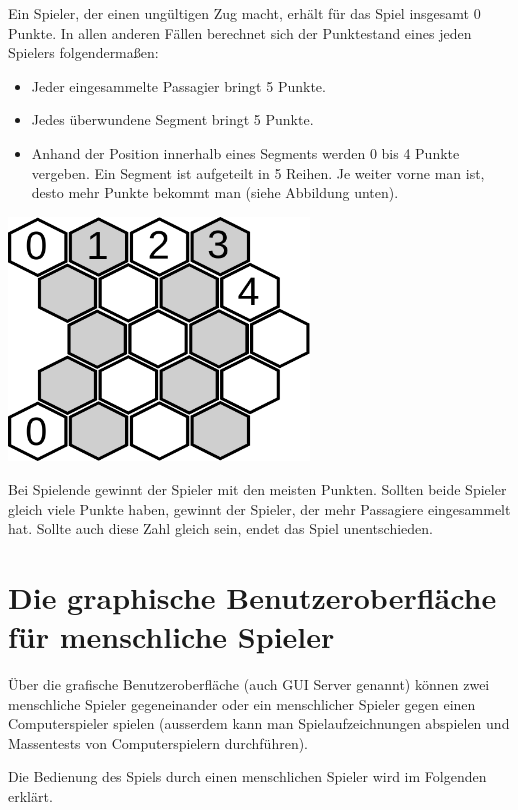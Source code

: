 \documentclass[12pt,a4paper, ngerman, oneside]{scrartcl}
\begin{document}
Ein Spieler, der einen ungültigen Zug macht, erhält für das Spiel insgesamt 0
Punkte. In allen anderen Fällen berechnet sich der Punktestand eines jeden
Spielers folgendermaßen:

\begin{itemize}
  \item Jeder eingesammelte Passagier bringt 5 Punkte.
  \item Jedes überwundene Segment bringt 5 Punkte.
  \item Anhand der Position innerhalb eines Segments werden 0 bis 4 Punkte
    vergeben. Ein Segment ist aufgeteilt in 5 Reihen. Je weiter vorne man ist,
    desto mehr Punkte bekommt man (siehe Abbildung unten).
\end{itemize}

\begin{centering}
  \includegraphics[width=0.6\textwidth]{bilder/segment-punkte.pdf}
\end{centering}

Bei Spielende gewinnt der Spieler mit den meisten Punkten. Sollten beide Spieler
gleich viele Punkte haben, gewinnt der Spieler, der mehr Passagiere eingesammelt
hat. Sollte auch diese Zahl gleich sein, endet das Spiel unentschieden.

\section{Die graphische Benutzeroberfläche für menschliche Spieler}

Über die grafische Benutzeroberfläche (auch GUI Server genannt) können zwei
menschliche Spieler gegeneinander oder ein menschlicher Spieler gegen einen
Computerspieler spielen (ausserdem kann man Spielaufzeichnungen abspielen und
Massentests von Computerspielern durchführen).

Die Bedienung des Spiels durch einen menschlichen Spieler wird im Folgenden
erklärt.
\end{document}
